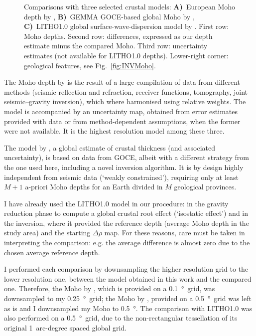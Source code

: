 \begin{figure}
	\begin{adjustbox}{center}
	\end{adjustbox}
	\caption[Comparisons of inverted Moho with three selected crustal models.]{Comparisons with three selected crustal models: \textbf{A)}~European Moho depth by \textcite{Grad2009}, \textbf{B)}~GEMMA GOCE-based global Moho by \textcite{Reguzzoni2015}, \textbf{C)}~{LITHO1.0} global surface-wave-dispersion model by \textcite{Pasyanos2014}.
	First row: Moho depths. Second row: differences, expressed as our depth estimate minus the compared Moho. Third row: uncertainty estimates (not available for {LITHO1.0} depths).
	Lower-right corner: geological features, see Fig.~\ref{fig:INVMoho}.}
	\label{fig:MohoComparisons}
\end{figure}

The Moho depth by \textcite{Grad2009} is the result of a large compilation of data from different methods (seismic reflection and refraction, receiver functions, tomography, joint seismic--gravity inversion), which where harmonised using relative weights.
The model is accompanied by an uncertainty map, obtained from error estimates provided with data or from method-dependent assumptions, when the former were not available.
It is the highest resolution model among these three.

The model by \textcite{Reguzzoni2015}, a global estimate of crustal thickness (and associated uncertainty), is based on data from GOCE, albeit with a different strategy from the one used here, including a novel inversion algorithm.
It is by design highly independent from seismic data (`weakly constrained'), requiring only at least $M+1$ a-priori Moho depths for an Earth divided in $M$ geological provinces.

I have already used the {LITHO1.0} \parencite{Pasyanos2014} model in our procedure: in the gravity reduction phase to compute a global crustal root effect (`isostatic effect') and in the inversion, where it provided the reference depth (average Moho depth in the study area) and the starting $\Delta \rho$ map.
For these reasons, care must be taken in interpreting the comparison: e.g. the average difference is almost zero due to the chosen average reference depth.

I performed each comparison by downsampling the higher resolution grid to the lower resolution one, between the model obtained in this work and the compared one.
Therefore, the Moho by \textcite{Grad2009}, which is provided on a \SI{0.1}{\degree}~grid, was downsampled to my \SI{0.25}{\degree}~grid; the Moho by \textcite{Reguzzoni2015}, provided on a \SI{0.5}{\degree}~grid was left as is and I downsampled my Moho to \SI{0.5}{\degree}.
The comparison with LITHO1.0 was also performed on a \SI{0.5}{\degree}~grid, due to the non-rectangular tessellation of its original \num{1}~arc-degree spaced global grid.

